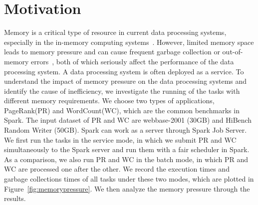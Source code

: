 \section{Motivation}
\label{sec:motivation}

Memory is a critical type of resource in current data processing systems, especially in the in-memory computing systems~\cite{shi:mammoth}. However, limited memory space leads to memory pressure and can cause frequent garbage collection or out-of-memory errors~\cite{fang2015interruptible}, both of which seriously affect the performance of the data processing system. A data processing system is often deployed as a service. To understand the impact of memory pressure on the data processing systems and identify the cause of inefficiency, we investigate the running of the tasks with different memory requirements. We choose two types of applications, PageRank(PR) and WordCount(WC), which are the common benchmarks in Spark. The input dataset of PR and WC are webbase-2001 (30GB) and HiBench Random Writer (50GB). 
Spark can work as a server through Spark Job Server. We first run the tasks in the service mode, in which we submit PR and WC simultaneously to the Spark server and run them with a fair scheduler in Spark. As a comparison, we also run PR and WC in the batch mode, in which PR and WC are processed one after the other. We record the execution times and garbage collections times of all tasks under these two modes, which are plotted in Figure~\ref{fig:memorypressure}. We then analyze the memory pressure through the results. 


